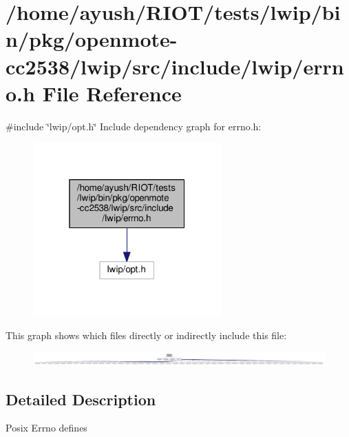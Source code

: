 \hypertarget{openmote-cc2538_2lwip_2src_2include_2lwip_2errno_8h}{}\section{/home/ayush/\+R\+I\+O\+T/tests/lwip/bin/pkg/openmote-\/cc2538/lwip/src/include/lwip/errno.h File Reference}
\label{openmote-cc2538_2lwip_2src_2include_2lwip_2errno_8h}
{\ttfamily \#include \char`\"{}lwip/opt.\+h\char`\"{}}\newline
Include dependency graph for errno.\+h\+:
\nopagebreak
\begin{figure}[H]
\begin{center}
\leavevmode
\includegraphics[width=205pt]{openmote-cc2538_2lwip_2src_2include_2lwip_2errno_8h__incl}
\end{center}
\end{figure}
This graph shows which files directly or indirectly include this file\+:
\nopagebreak
\begin{figure}[H]
\begin{center}
\leavevmode
\includegraphics[width=350pt]{openmote-cc2538_2lwip_2src_2include_2lwip_2errno_8h__dep__incl}
\end{center}
\end{figure}


\subsection{Detailed Description}
Posix Errno defines 